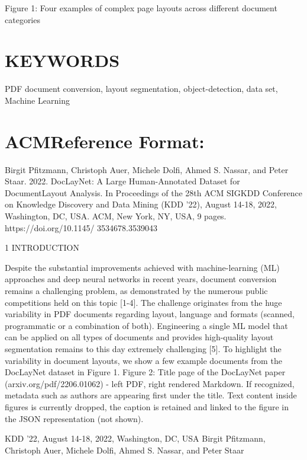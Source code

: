 \documentclass[11pt,a4paper]{article}
\begin{document}
\begin{figure}[h]
\end{figure}

Figure 1: Four examples of complex page layouts across different document categories

\section{KEYWORDS}

PDF document conversion, layout segmentation, object-detection, data set, Machine Learning

\section{ACMReference Format:}

Birgit Pfitzmann, Christoph Auer, Michele Dolfi, Ahmed S. Nassar, and Peter Staar. 2022. DocLayNet: A Large Human-Annotated Dataset for DocumentLayout Analysis. In Proceedings of the 28th ACM SIGKDD Conference on Knowledge Discovery and Data Mining (KDD '22), August 14-18, 2022, Washington, DC, USA. ACM, New York, NY, USA, 9 pages. https://doi.org/10.1145/ 3534678.3539043

1 INTRODUCTION

Despite the substantial improvements achieved with machine-learning (ML) approaches and deep neural networks in recent years, document conversion remains a challenging problem, as demonstrated by the numerous public competitions held on this topic [1-4]. The challenge originates from the huge variability in PDF documents regarding layout, language and formats (scanned, programmatic or a combination of both). Engineering a single ML model that can be applied on all types of documents and provides high-quality layout segmentation remains to this day extremely challenging [5]. To highlight the variability in document layouts, we show a few example documents from the DocLayNet dataset in Figure 1. Figure 2: Title page of the DocLayNet paper (arxiv.org/pdf/2206.01062) - left PDF, right rendered Markdown. If recognized, metadata such as authors are appearing first under the title. Text content inside figures is currently dropped, the caption is retained and linked to the figure in the JSON representation (not shown).

KDD '22, August 14-18, 2022, Washington, DC, USA Birgit Pfitzmann, Christoph Auer, Michele Dolfi, Ahmed S. Nassar, and Peter Staar
\end{document}

